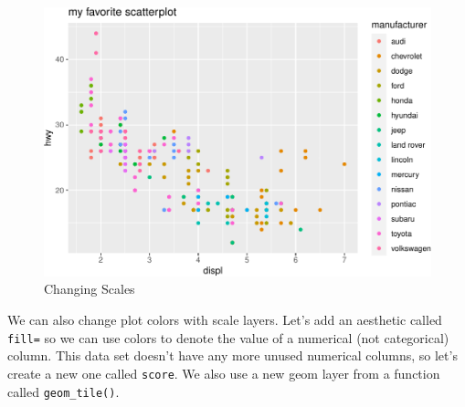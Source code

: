 \documentclass[
  12pt,
]{krantz}
\makeatletter
\newenvironment{Shaded}{\begin{snugshade}}{\end{snugshade}}
\newcommand{\AttributeTok}[1]{\textcolor[rgb]{0.61,0.61,0.61}{#1}}
\newcommand{\DecValTok}[1]{\textcolor[rgb]{0.06,0.06,0.06}{#1}}
\newcommand{\FunctionTok}[1]{\textcolor[rgb]{0,0,0}{#1}}
\newcommand{\NormalTok}[1]{#1}
\newcommand{\OtherTok}[1]{\textcolor[rgb]{0.37,0.37,0.37}{#1}}
\newcommand{\SpecialCharTok}[1]{\textcolor[rgb]{0,0,0}{#1}}
\newenvironment{kframe}{%
\medskip{}
\setlength{\fboxsep}{.8em}
 \def\at@end@of@kframe{}%
 \ifinner\ifhmode%
  \def\at@end@of@kframe{\end{minipage}}%
  \begin{minipage}{\columnwidth}%
 \fi\fi%
 \def\FrameCommand##1{\hskip\@totalleftmargin \hskip-\fboxsep
 \colorbox{shadecolor}{##1}\hskip-\fboxsep
     \hskip-\linewidth \hskip-\@totalleftmargin \hskip\columnwidth}%
 \MakeFramed {\advance\hsize-\width
   \@totalleftmargin\z@ \linewidth\hsize
   \@setminipage}}%
 {\par\unskip\endMakeFramed%
 \at@end@of@kframe}
\renewenvironment{Shaded}{\begin{kframe}}{\end{kframe}}
\makeatother
\begin{document}
\begin{figure}
\centering
\includegraphics{r_and_python_book_files/figure-latex/unnamed-chunk-172-1.pdf}
\caption{\label{fig:unnamed-chunk-172}Changing Scales}
\end{figure}

We can also change plot colors with scale layers. Let's add an aesthetic called \texttt{fill=} so we can use colors to denote the value of a numerical (not categorical) column. This data set doesn't have any more unused numerical columns, so let's create a new one called \texttt{score}. We also use a new geom layer from a function called \texttt{geom\_tile()}.

\begin{Shaded}
\end{Shaded}
\end{document}
